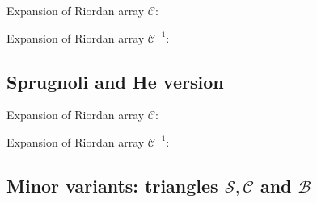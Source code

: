 \documentclass[11pt,a4paper]{article} %
\begin{document}
    Expansion of Riordan array $\mathcal{C}$:
    
    Expansion of Riordan array $\mathcal{C}^{-1}$:
    

    
    

    \subsection{Sprugnoli and He version}

    Expansion of Riordan array $\mathcal{C}$:
    
    Expansion of Riordan array $\mathcal{C}^{-1}$:
    

    
    
    
    

    \subsection{Minor variants: triangles $\mathcal{S}, \mathcal{C}$ and $\mathcal{B}$}
\end{document}
